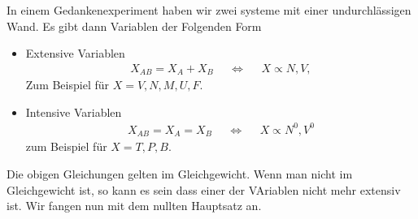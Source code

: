 \documentclass[11pt]{article}
\theoremstyle{plain}
\theoremstyle{mytheoremstyle}
\begin{document}
In einem Gedankenexperiment haben wir zwei systeme mit einer undurchl\"assigen
Wand. Es gibt dann Variablen der Folgenden Form
\begin{itemize}
  \item Extensive Variablen
    \begin{align*}
      X_{AB} = X_A + X_B && \iff &&  X \propto N, V, 
    \end{align*}
    Zum Beispiel f\"ur $X = V, N, M, U, F$.
  \item Intensive Variablen
    \begin{align*}
      X_{AB} = X_A = X_B &&  \iff && X \propto N^0, V^0
    \end{align*}
    zum Beispiel f\"ur $X = T, P , B$.
\end{itemize}
Die obigen Gleichungen gelten im Gleichgewicht. Wenn man nicht im
Gleichgewicht ist, so kann es sein dass einer der VAriablen nicht mehr
extensiv ist. Wir fangen nun mit dem nullten Hauptsatz an.
\end{document}
